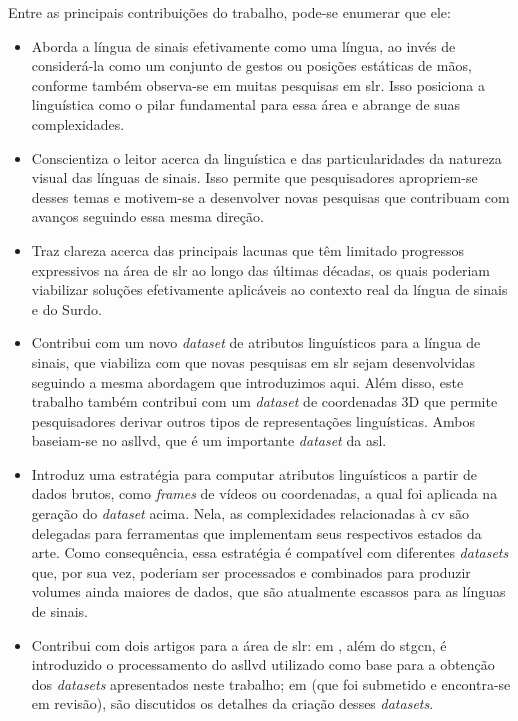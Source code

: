 Entre as principais contribuições do trabalho, pode-se enumerar que ele:

\begin{itemize}
      \item Aborda a língua de sinais efetivamente como uma língua, ao invés de considerá-la como um conjunto de gestos ou posições estáticas de mãos, conforme também observa-se em muitas pesquisas em \acrshort{slr}.
            Isso posiciona a linguística como o pilar fundamental para essa área e abrange de suas complexidades.
 
      \item Conscientiza o leitor acerca da linguística e das particularidades da natureza visual das línguas de sinais.
            Isso permite que pesquisadores apropriem-se desses temas e motivem-se a desenvolver novas pesquisas que contribuam com avanços seguindo essa mesma direção.

      \item Traz clareza acerca das principais lacunas que têm limitado progressos expressivos na área de \acrshort{slr} ao longo das últimas décadas, os quais poderiam viabilizar soluções efetivamente aplicáveis ao contexto real da língua de sinais e do Surdo.

      \item Contribui com um novo \textit{dataset} de atributos linguísticos para a língua de sinais, que viabiliza com que novas pesquisas em \acrshort{slr} sejam desenvolvidas seguindo a mesma abordagem que introduzimos aqui.
            Além disso, este trabalho também contribui com um \textit{dataset} de coordenadas 3D que permite pesquisadores derivar outros tipos de representações linguísticas.
            Ambos baseiam-se no \acrshort{asllvd}, que é um importante \textit{dataset} da \acrshort{asl}.

      \item Introduz uma estratégia para computar atributos linguísticos a partir de dados brutos, como \textit{frames} de vídeos ou coordenadas, a qual foi aplicada na geração do \textit{dataset} acima.
            Nela, as complexidades relacionadas à \acrlong{cv} são delegadas para ferramentas que implementam seus respectivos estados da arte.
            Como consequência, essa estratégia é compatível com diferentes \textit{datasets} que, por sua vez, poderiam ser processados e combinados para produzir volumes ainda maiores de dados, que são atualmente escassos para as línguas de sinais.
 
      \item Contribui com dois artigos para a área de \acrshort{slr}:
            em , além do \acrshort{stgcn}, é introduzido o processamento do \acrshort{asllvd} utilizado como base para a obtenção dos \textit{datasets} apresentados neste trabalho;
            em  (que foi submetido e encontra-se em revisão), são discutidos os detalhes da criação desses \textit{datasets}.

\end{itemize}

